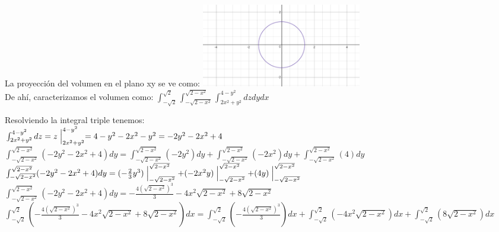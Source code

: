 \documentclass{article}
\begin{document}
\begin{enumerate}
{		La proyección del volumen en el plano xy se ve como:
		\includegraphics[width=7cm]{ejercicio71.png}\\
		
		De ahí, caracterizamos el volumen como: $\int_{-\sqrt{2}}^{\sqrt{2}}\int_{-\sqrt{2-x^2}}^{\sqrt{2-x^2}}\int_{2x^2+y^2}^{4-y^2}dzdydx$
	
		Resolviendo la integral triple tenemos:\\
		$\int_{2x^2+y^2}^{4-y^2}dz = z\Bigm|_{2x^2+y^2}^{4-y^2} = 4-y^2-2x^2-y^2 = -2y^2-2x^2+4 $\\
		
		$\int_{-\sqrt{2-x^2}}^{\sqrt{2-x^2}} (-2y^2-2x^2+4)dy = \int_{-\sqrt{2-x^2}}^{\sqrt{2-x^2}} (-2y^2)dy +  \int_{-\sqrt{2-x^2}}^{\sqrt{2-x^2}} (-2x^2)dy + \int_{-\sqrt{2-x^2}}^{\sqrt{2-x^2}} (4)dy $\\
		$\int_{-\sqrt{2-x^2}}^{\sqrt{2-x^2}} (-2y^2-2x^2+4)dy = (-\frac{2}{3}y^3)\Bigm|_{-\sqrt{2-x^2}}^{\sqrt{2-x^2}} + (-2x^2y)\Bigm|_{-\sqrt{2-x^2}}^{\sqrt{2-x^2}} + (4y)\Bigm|_{-\sqrt{2-x^2}}^{\sqrt{2-x^2}}$\\
		$\int_{-\sqrt{2-x^2}}^{\sqrt{2-x^2}} (-2y^2-2x^2+4)dy = -\frac{4(\sqrt{2-x^2})^3}{3} -4x^2\sqrt{2-x^2} + 8\sqrt{2-x^2} $\\
		
		$\int_{-\sqrt{2}}^{\sqrt{2}}(-\frac{4(\sqrt{2-x^2})^3}{3} -4x^2\sqrt{2-x^2} + 8\sqrt{2-x^2})dx = \int_{-\sqrt{2}}^{\sqrt{2}}(-\frac{4(\sqrt{2-x^2})^3}{3})dx + \int_{-\sqrt{2}}^{\sqrt{2}}(-4x^2\sqrt{2-x^2})dx+ \int_{-\sqrt{2}}^{\sqrt{2}}(8\sqrt{2-x^2})dx $\\
		
}
\end{enumerate}
\end{document}
